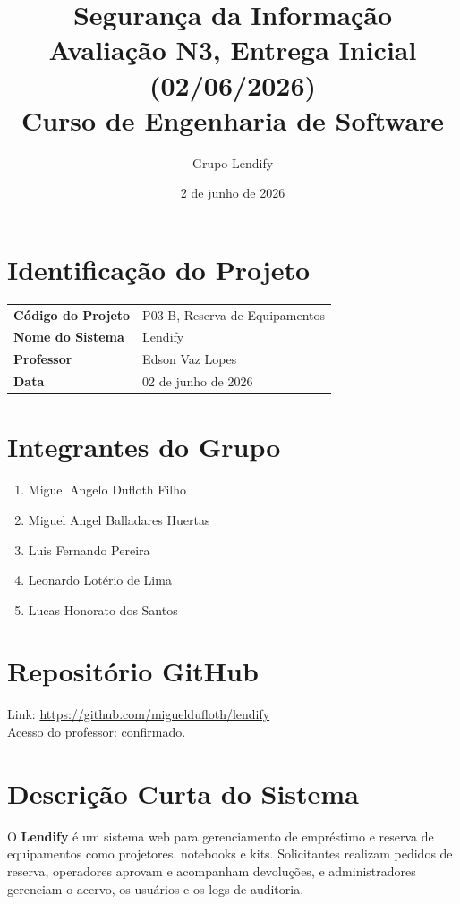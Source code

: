 \documentclass[12pt,a4paper]{article}
\title{
    \textbf{Segurança da Informação} \\
    \large Avaliação N3, Entrega Inicial (02/06/2026) \\
    \normalsize Curso de Engenharia de Software
}
\author{Grupo Lendify}
\date{2 de junho de 2026}
\begin{document}
\maketitle

\section*{Identificação do Projeto}

\begin{tabular}{@{}ll@{}}
\toprule
\textbf{Código do Projeto} & P03-B, Reserva de Equipamentos \\
\textbf{Nome do Sistema}   & Lendify \\
\textbf{Professor}         & Edson Vaz Lopes \\
\textbf{Data}              & 02 de junho de 2026 \\
\bottomrule
\end{tabular}

\section*{Integrantes do Grupo}

\begin{enumerate}
    \item Miguel Angelo Dufloth Filho
    \item Miguel Angel Balladares Huertas
    \item Luis Fernando Pereira
    \item Leonardo Lotério de Lima
    \item Lucas Honorato dos Santos
\end{enumerate}

\section*{Repositório GitHub}

Link: \url{https://github.com/migueldufloth/lendify} \\
Acesso do professor: confirmado.

\section*{Descrição Curta do Sistema}

O \textbf{Lendify} é um sistema web para gerenciamento de empréstimo e reserva de
equipamentos como projetores, notebooks e kits. Solicitantes realizam pedidos de
reserva, operadores aprovam e acompanham devoluções, e administradores gerenciam
o acervo, os usuários e os logs de auditoria.
\end{document}
